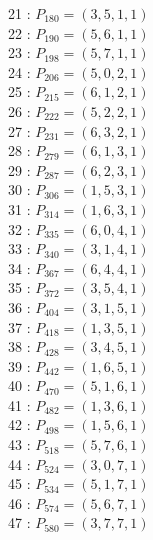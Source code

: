 \documentclass{article}
\begin{document}
{\begin{multicols}{2}
21 : $P_{180}=( 3, 5, 1, 1 )$\\
22 : $P_{190}=( 5, 6, 1, 1 )$\\
23 : $P_{198}=( 5, 7, 1, 1 )$\\
24 : $P_{206}=( 5, 0, 2, 1 )$\\
25 : $P_{215}=( 6, 1, 2, 1 )$\\
26 : $P_{222}=( 5, 2, 2, 1 )$\\
27 : $P_{231}=( 6, 3, 2, 1 )$\\
28 : $P_{279}=( 6, 1, 3, 1 )$\\
29 : $P_{287}=( 6, 2, 3, 1 )$\\
30 : $P_{306}=( 1, 5, 3, 1 )$\\
31 : $P_{314}=( 1, 6, 3, 1 )$\\
32 : $P_{335}=( 6, 0, 4, 1 )$\\
33 : $P_{340}=( 3, 1, 4, 1 )$\\
34 : $P_{367}=( 6, 4, 4, 1 )$\\
35 : $P_{372}=( 3, 5, 4, 1 )$\\
36 : $P_{404}=( 3, 1, 5, 1 )$\\
37 : $P_{418}=( 1, 3, 5, 1 )$\\
38 : $P_{428}=( 3, 4, 5, 1 )$\\
39 : $P_{442}=( 1, 6, 5, 1 )$\\
40 : $P_{470}=( 5, 1, 6, 1 )$\\
41 : $P_{482}=( 1, 3, 6, 1 )$\\
42 : $P_{498}=( 1, 5, 6, 1 )$\\
43 : $P_{518}=( 5, 7, 6, 1 )$\\
44 : $P_{524}=( 3, 0, 7, 1 )$\\
45 : $P_{534}=( 5, 1, 7, 1 )$\\
46 : $P_{574}=( 5, 6, 7, 1 )$\\
47 : $P_{580}=( 3, 7, 7, 1 )$\\
\end{multicols}
}
\end{document}
